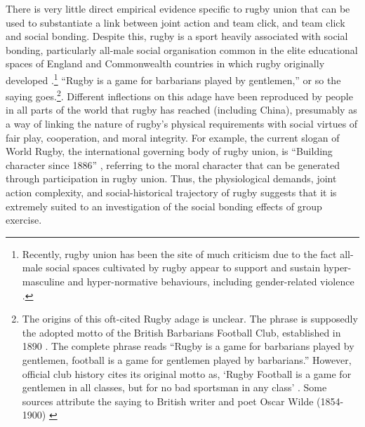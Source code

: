 There is very little direct empirical evidence specific to rugby union that can be used to substantiate a link between joint action and team click, and team click and social bonding.  Despite this, rugby is a sport heavily associated with social bonding, particularly all-male social organisation common in the elite educational spaces of England and Commonwealth countries in which rugby originally developed \citep{Dunning2005,Richards2007,Collins2008}.\footnote{Recently, rugby union has been the site of much criticism due to the fact all-male social spaces cultivated by rugby appear to support and sustain hyper-masculine and hyper-normative behaviours, including gender-related violence \citep{Cosslett2014}.
}   ``Rugby is a game for barbarians played by gentlemen,'' or so the saying goes.\footnote{The origins of this oft-cited Rugby adage is unclear.  The phrase is supposedly the adopted motto of the British Barbarians Football Club, established in 1890 \citep[34]{Dunning2005}.  The complete phrase reads ``Rugby is a game for barbarians played by gentlemen, football is a game for gentlemen played by barbarians.''  However, official club history cites its original motto as, ‘Rugby Football is a game for gentlemen in all classes, but for no bad sportsman in any class' \citep[vii]{Starmer-Smith1977}.  Some sources attribute the saying to British writer and poet Oscar Wilde (1854-1900) \citep{Fleenor2015}}. Different inflections on this adage have been reproduced by people in all parts of the world that rugby has reached (including China), presumably as a way of linking the nature of rugby's physical requirements with social virtues of fair play, cooperation, and moral integrity.
For example, the current slogan of World Rugby, the international governing body of rugby union, is ``Building character since 1886'' \citep{WorldRugby2017}, referring to the moral character that can be generated through participation in rugby union.  Thus, the physiological demands, joint action complexity, and social-historical trajectory of rugby suggests that it is extremely suited to an investigation of the social bonding effects of group exercise.








